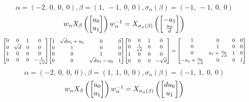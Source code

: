 \documentclass[11pt]{article}
\theoremstyle{definition}
\begin{document}
\[
\alpha = \left( -2, \  0, \  0, \  0\right), \beta = \left( 1, \  -1, \  0, \  0\right), \sigma_{\alpha}(\beta) = \left( -1, \  -1, \  0, \  0\right)
\]
\[
\scaletoalign{\textwidth}{w_{\alpha} X_{\beta}\left(\left[\begin{matrix}u_{0}\\u_{1}\end{matrix}\right]\right) w_{\alpha}^{-1} = X_{\sigma_{\alpha}\left(\beta\right)}\left(\left[\begin{matrix}- u_{1}\\\frac{u_{0}}{d}\end{matrix}\right]\right)}
\]
\[
\scaletoalign{\textwidth}{{\left[\begin{matrix}0 & 0 & 1 & 0\\0 & \sqrt{d} & 0 & 0\\1 & 0 & 0 & 0\\0 & 0 & 0 & - \frac{1}{\sqrt{d}}\end{matrix}\right]} {\left[\begin{matrix}1 & \sqrt{d} u_{1} + u_{0} & 0 & 0\\0 & 1 & 0 & 0\\0 & 0 & 1 & 0\\0 & 0 & \sqrt{d} u_{1} - u_{0} & 1\end{matrix}\right]} {\left[\begin{matrix}0 & 0 & 1 & 0\\0 & \frac{1}{\sqrt{d}} & 0 & 0\\1 & 0 & 0 & 0\\0 & 0 & 0 & - \sqrt{d}\end{matrix}\right]} = {\left[\begin{matrix}1 & 0 & 0 & 0\\0 & 1 & 0 & 0\\0 & u_{1} + \frac{u_{0}}{\sqrt{d}} & 1 & 0\\- u_{1} + \frac{u_{0}}{\sqrt{d}} & 0 & 0 & 1\end{matrix}\right]}}
\]
\[
\alpha = \left( -2, \  0, \  0, \  0\right), \beta = \left( 1, \  1, \  0, \  0\right), \sigma_{\alpha}(\beta) = \left( -1, \  1, \  0, \  0\right)
\]
\[
\scaletoalign{\textwidth}{w_{\alpha} X_{\beta}\left(\left[\begin{matrix}u_{0}\\u_{1}\end{matrix}\right]\right) w_{\alpha}^{-1} = X_{\sigma_{\alpha}\left(\beta\right)}\left(\left[\begin{matrix}d u_{0}\\u_{1}\end{matrix}\right]\right)}
\]
\end{document}
